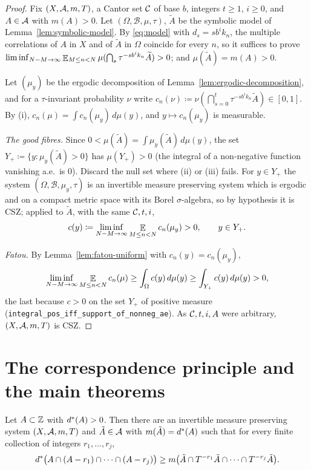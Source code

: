 \begin{proof}
  Fix $(X,\mathcal{A},m,T)$, a Cantor set $\mathcal{C}$ of base $b$, integers $t \geq 1$, $i \geq 0$, and
  $A \in \mathcal{A}$ with $m(A) > 0$.  Let $(\Omega,\mathcal B,\mu,\tau)$, $\widetilde A$ be the
  symbolic model of Lemma~\ref{lem:symbolic-model}.  By \eqref{eq:model} with
  $d_s = sb^ik_n$, the multiple correlations of $A$ in $X$ and of $\widetilde A$ in $\Omega$
  coincide for every $n$, so it suffices to prove
  $\liminf_{N-M \to \infty}\mathop{\mathbb{E}}_{M \leq n < N} \mu(\bigcap_{s} \tau^{-sb^ik_n}\widetilde A) > 0$; and
  $\mu(\widetilde A) = m(A) > 0$.

  Let $(\mu_y)$ be the ergodic decomposition of Lemma~\ref{lem:ergodic-decomposition}, and
  for a $\tau$-invariant probability $\nu$ write
  $c_n(\nu) \coloneqq \nu(\bigcap_{s=0}^{t}\tau^{-sb^ik_n}\widetilde A) \in [0,1]$.  By (i),
  $c_n(\mu) = \int c_n(\mu_y)\,d\mu(y)$, and $y \mapsto c_n(\mu_y)$ is measurable.

  \emph{The good fibres.}  Since $0 < \mu(\widetilde A) = \int \mu_y(\widetilde A)\,d\mu(y)$, the
  set $Y_+ \coloneqq \{y : \mu_y(\widetilde A) > 0\}$ has $\mu(Y_+) > 0$ (the integral of a
  non-negative function vanishing a.e.\ is $0$).  Discard the null set where (ii) or (iii)
  fails.  For $y \in Y_+$ the system $(\Omega,\mathcal B,\mu_y,\tau)$ is an invertible measure
  preserving system which is ergodic and on a compact metric space with its Borel
  $\sigma$-algebra, so by hypothesis it is CSZ; applied to $\widetilde A$, with the same
  $\mathcal{C}, t, i$,
  \[
    c(y) \coloneqq \liminf_{N-M \to \infty}\mathop{\mathbb{E}}_{M \leq n < N} c_n(\mu_y) > 0 , \qquad y \in Y_+ .
  \]

  \emph{Fatou.}  By Lemma~\ref{lem:fatou-uniform} with $c_n(y) = c_n(\mu_y)$,
  \[
    \liminf_{N-M \to \infty}\mathop{\mathbb{E}}_{M \leq n < N} c_n(\mu) \geq \int_\Omega c(y)\,d\mu(y) \geq \int_{Y_+} c(y)\,d\mu(y) > 0 ,
  \]
  the last because $c > 0$ on the set $Y_+$ of positive measure
  (\texttt{integral\_pos\_iff\_support\_of\_nonneg\_ae}).  As $\mathcal{C}, t, i, A$ were arbitrary,
  $(X,\mathcal{A},m,T)$ is CSZ.
\end{proof}

\section{The correspondence principle and the main theorems}

\begin{theorem}
  \label{thm:furstenberg-correspondence}
  \leanok
  Let $A \subset \mathbb{Z}$ with $d^{\ast}(A) > 0$.  Then there are an invertible measure preserving
  system $(X,\mathcal{A},m,T)$ and $\tilde A \in \mathcal{A}$ with $m(\tilde A) = d^{\ast}(A)$ such that for every
  finite collection of integers $r_1,\dots,r_j$,
  \begin{equation}
    \label{eq:correspondence}
    d^{\ast}\bigl( A \cap (A-r_1) \cap \cdots \cap (A-r_j) \bigr)
      \geq m\bigl( \tilde A \cap T^{-r_1}\tilde A \cap \cdots \cap T^{-r_j}\tilde A \bigr) .
  \end{equation}
\end{theorem}

